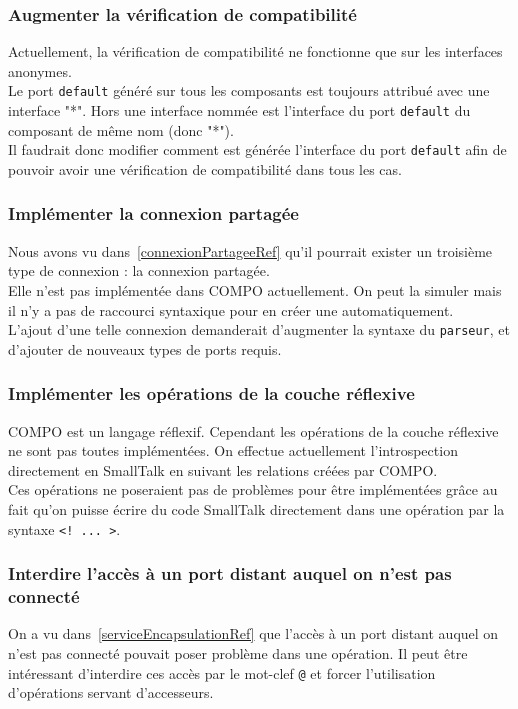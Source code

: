 \documentclass[11pt,a4paper,openany,oneside]{book}
\begin{document}
\subsubsection{Augmenter la vérification de compatibilité}
Actuellement, la vérification de compatibilité ne fonctionne que sur les interfaces anonymes.\\
Le port \texttt{default} généré sur tous les composants est toujours attribué avec une interface "*". Hors une interface nommée est l'interface du port \texttt{default} du composant de même nom (donc "*").\\
Il faudrait donc modifier comment est générée l'interface du port \texttt{default} afin de pouvoir avoir une vérification de compatibilité dans tous les cas.

\subsubsection{Implémenter la connexion partagée}
Nous avons vu dans~\ref{connexionPartageeRef} qu'il pourrait exister un troisième type de connexion : la connexion partagée.\\
Elle n'est pas implémentée dans COMPO actuellement. On peut la simuler mais il n'y a pas de raccourci syntaxique pour en créer une automatiquement.\\
L'ajout d'une telle connexion demanderait d'augmenter la syntaxe du \texttt{parseur}, et d'ajouter de nouveaux types de ports requis.

\subsubsection{Implémenter les opérations de la couche réflexive}
COMPO est un langage réflexif. Cependant les opérations de la couche réflexive ne sont pas toutes implémentées. On effectue actuellement l'introspection directement en SmallTalk en suivant les relations créées par COMPO.\\
Ces opérations ne poseraient pas de problèmes pour être implémentées grâce au fait qu'on puisse écrire du code SmallTalk directement dans une opération par la syntaxe \texttt{<! ... >}.

\subsubsection{Interdire l'accès à un port distant auquel on n'est pas connecté}
On a vu dans~\ref{serviceEncapsulationRef} que l'accès à un port distant auquel on n'est pas connecté pouvait poser problème dans une opération. Il peut être intéressant d'interdire ces accès par le mot-clef \texttt{@} et forcer l'utilisation d'opérations servant d'accesseurs.
\end{document}
